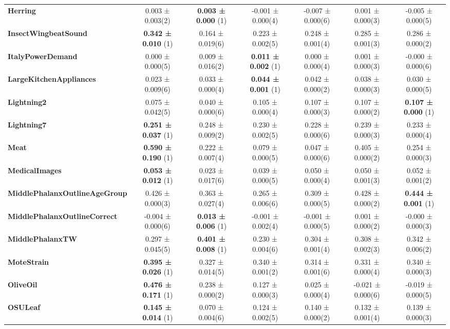 \begin{table}[ht]
\begin{adjustbox}{width=\textwidth}
\begin{tabular}{lcccccc}
\textbf{Herring} & 0.003 ± 0.003(2) & \textbf{0.003 ± 0.000} (1) & -0.001 ± 0.000(4) & -0.007 ± 0.000(6) & 0.001 ± 0.000(3) & -0.005 ± 0.000(5) \\
\textbf{InsectWingbeatSound} & \textbf{0.342 ± 0.010} (1) & 0.164 ± 0.019(6) & 0.223 ± 0.002(5) & 0.248 ± 0.001(4) & 0.285 ± 0.001(3) & 0.286 ± 0.000(2) \\
\textbf{ItalyPowerDemand} & 0.000 ± 0.000(5) & 0.009 ± 0.016(2) & \textbf{0.011 ± 0.002} (1) & 0.000 ± 0.000(4) & 0.001 ± 0.000(3) & -0.000 ± 0.000(6) \\
\textbf{LargeKitchenAppliances} & 0.023 ± 0.009(6) & 0.033 ± 0.000(4) & \textbf{0.044 ± 0.001} (1) & 0.042 ± 0.000(2) & 0.038 ± 0.000(3) & 0.030 ± 0.000(5) \\
\textbf{Lightning2} & 0.075 ± 0.042(5) & 0.040 ± 0.000(6) & 0.105 ± 0.000(4) & 0.107 ± 0.000(3) & 0.107 ± 0.000(2) & \textbf{0.107 ± 0.000} (1) \\
\textbf{Lightning7} & \textbf{0.251 ± 0.037} (1) & 0.248 ± 0.009(2) & 0.230 ± 0.002(5) & 0.228 ± 0.000(6) & 0.239 ± 0.000(3) & 0.233 ± 0.000(4) \\
\textbf{Meat} & \textbf{0.590 ± 0.190} (1) & 0.222 ± 0.007(4) & 0.079 ± 0.000(5) & 0.047 ± 0.000(6) & 0.405 ± 0.000(2) & 0.254 ± 0.000(3) \\
\textbf{MedicalImages} & \textbf{0.053 ± 0.012} (1) & 0.023 ± 0.017(6) & 0.039 ± 0.000(5) & 0.050 ± 0.000(4) & 0.050 ± 0.001(3) & 0.052 ± 0.001(2) \\
\textbf{MiddlePhalanxOutlineAgeGroup} & 0.426 ± 0.000(3) & 0.363 ± 0.027(4) & 0.265 ± 0.006(6) & 0.309 ± 0.000(5) & 0.428 ± 0.000(2) & \textbf{0.444 ± 0.001} (1) \\
\textbf{MiddlePhalanxOutlineCorrect} & -0.004 ± 0.000(6) & \textbf{0.013 ± 0.006} (1) & -0.001 ± 0.002(4) & -0.001 ± 0.000(5) & 0.001 ± 0.000(2) & -0.000 ± 0.000(3) \\
\textbf{MiddlePhalanxTW} & 0.297 ± 0.045(5) & \textbf{0.401 ± 0.008} (1) & 0.230 ± 0.004(6) & 0.304 ± 0.001(4) & 0.308 ± 0.002(3) & 0.342 ± 0.006(2) \\
\textbf{MoteStrain} & \textbf{0.395 ± 0.026} (1) & 0.327 ± 0.014(5) & 0.340 ± 0.001(2) & 0.314 ± 0.001(6) & 0.331 ± 0.000(4) & 0.340 ± 0.000(3) \\
\textbf{OliveOil} & \textbf{0.476 ± 0.171} (1) & 0.238 ± 0.000(2) & 0.127 ± 0.000(3) & 0.025 ± 0.000(4) & -0.021 ± 0.000(6) & -0.019 ± 0.000(5) \\
\textbf{OSULeaf} & \textbf{0.145 ± 0.014} (1) & 0.070 ± 0.004(6) & 0.124 ± 0.002(5) & 0.140 ± 0.000(2) & 0.132 ± 0.001(4) & 0.139 ± 0.000(3) \\

\end{tabular}
\end{adjustbox}
\end{table}
